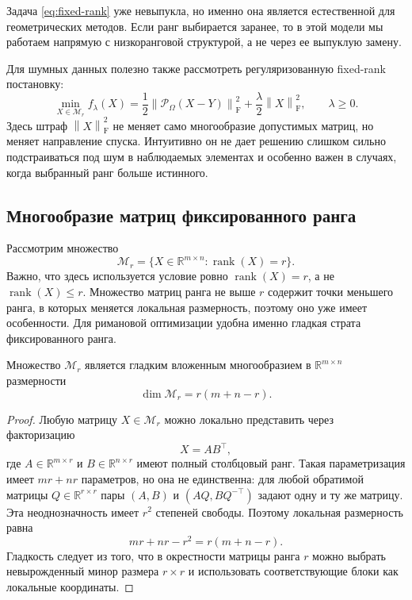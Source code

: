 \documentclass[a4paper,12pt]{article}
\newcommand{\R}{\mathbb{R}}
\newcommand{\fro}[1]{\left\lVert #1 \right\rVert_{\mathrm F}}
\newcommand{\rank}{\operatorname{rank}}
\renewcommand{\Proj}{\mathcal{P}}
\newcommand{\Mcal}{\mathcal{M}}
\begin{document}
Задача \eqref{eq:fixed-rank} уже невыпукла, но именно она является естественной для геометрических методов. Если ранг выбирается заранее, то в этой модели мы работаем напрямую с низкоранговой структурой, а не через ее выпуклую замену.

Для шумных данных полезно также рассмотреть регуляризованную fixed-rank постановку:
\begin{equation}
\label{eq:fixed-rank-regularized}
\min_{X \in \Mcal_r} f_\lambda(X)
= \frac12 \fro{\Proj_\Omega(X-Y)}^2 + \frac{\lambda}{2}\fro{X}^2,
\qquad \lambda\ge 0.
\end{equation}
Здесь штраф $\fro{X}^2$ не меняет само многообразие допустимых матриц, но меняет направление спуска. Интуитивно он не дает решению слишком сильно подстраиваться под шум в наблюдаемых элементах и особенно важен в случаях, когда выбранный ранг больше истинного.


\subsection{Многообразие матриц фиксированного ранга}

Рассмотрим множество
\[
\Mcal_r = \{X \in \R^{m \times n} : \rank(X)=r\}.
\]
Важно, что здесь используется условие ровно $\rank(X)=r$, а не $\rank(X)\le r$. Множество матриц ранга не выше $r$ содержит точки меньшего ранга, в которых меняется локальная размерность, поэтому оно уже имеет особенности. Для римановой оптимизации удобна именно гладкая страта фиксированного ранга.

\begin{proposition}
Множество $\Mcal_r$ является гладким вложенным многообразием в $\R^{m\times n}$ размерности
\[
\dim \Mcal_r=r(m+n-r).
\]
\end{proposition}

\begin{proof}
Любую матрицу $X\in\Mcal_r$ можно локально представить через факторизацию
\[
X=AB^\top,
\]
где $A\in\R^{m\times r}$ и $B\in\R^{n\times r}$ имеют полный столбцовый ранг. Такая параметризация имеет $mr+nr$ параметров, но она не единственна: для любой обратимой матрицы $Q\in\R^{r\times r}$ пары $(A,B)$ и $(AQ,BQ^{-\top})$ задают одну и ту же матрицу. Эта неоднозначность имеет $r^2$ степеней свободы. Поэтому локальная размерность равна
\[
mr+nr-r^2=r(m+n-r).
\]
Гладкость следует из того, что в окрестности матрицы ранга $r$ можно выбрать невырожденный минор размера $r\times r$ и использовать соответствующие блоки как локальные координаты.
\end{proof}
\end{document}
